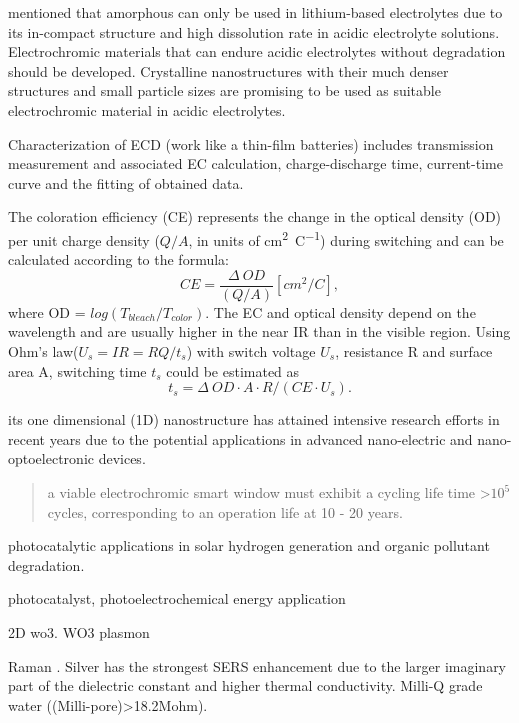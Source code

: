 \citeauthor{Wang2009a} mentioned that amorphous  can only be used in lithium-based electrolytes due to its
in-compact structure and high dissolution rate in acidic electrolyte solutions. Electrochromic materials that can endure acidic electrolytes without degradation should be developed. Crystalline  nanostructures with their much denser structures and small particle sizes are promising to be used as suitable electrochromic material in acidic electrolytes.

Characterization of ECD (work like a thin-film batteries) includes transmission measurement and associated EC calculation, charge-discharge time, current-time curve and the fitting of obtained data.

The coloration efficiency (CE) represents the change in the optical density (OD) per unit charge density ($Q/A$, in units of \si{\cm^2\per\coulomb}) during switching and can be calculated according to the formula:
\begin{equation}
CE = \frac{\Delta~OD}{(Q/A)} [cm^2/C],
\end{equation}
where OD = $log(T_{bleach}/T_{color})$. The EC and optical density depend on the wavelength and are usually higher in the near IR than in the visible region.
Using Ohm's law($U_s = IR = RQ/t_s$) with switch voltage $U_s$, resistance R and surface area A, switching time $t_s$ could be estimated as
\begin{equation}
t_s = \Delta~OD\cdot A \cdot R /(CE\cdot U_s).
\end{equation}

its one dimensional (1D) nanostructure has attained intensive research efforts in recent years due to the potential applications in advanced nano-electric and nano-optoelectronic devices.

\begin{quote}
a viable electrochromic smart window must exhibit a cycling life time \textgreater $10^5$ cycles, corresponding to an operation life at 10 - 20 years.
\end{quote}



photocatalytic applications in solar hydrogen generation and organic pollutant degradation.

photocatalyst\cite{Macphee2010}, photoelectrochemical energy application \cite{Su2010}

2D wo3.\cite{Kalantar-zadeh2010a} 
WO3 plasmon \cite{Manthiram2012}

Raman \cite{Xiao2007}. Silver has the strongest SERS enhancement due to the larger imaginary part of the dielectric constant and higher thermal conductivity. Milli-Q grade water ((Milli-pore)\textgreater 18.2Mohm).

